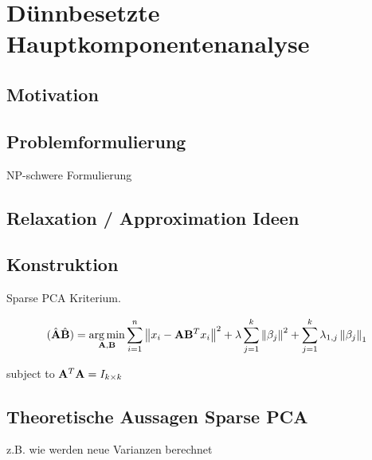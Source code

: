 \chapter{Dünnbesetzte Hauptkomponentenanalyse}

\label{sparse_pca}

\section{Motivation}

\section{Problemformulierung}
NP-schwere Formulierung

\section{Relaxation / Approximation Ideen}

\section{Konstruktion}

Sparse PCA Kriterium.

$$(\hat{\mathbf{A}}\hat{\mathbf{B}}) = \operatorname*{arg\,min}_{\mathbf{A}, \mathbf{B}} \sum_{i=1}^{n} \left\lVert x_i - \mathbf{A}\mathbf{B}^Tx_i \right\rVert^2 + \lambda \sum_{j=1}^{k}\left\lVert \beta_j \right\rVert^2 + \sum_{j=1}^k \lambda_{1,j} \left\lVert \beta_j \right\rVert_1$$

subject to $\mathbf{A}^T\mathbf{A} = I_{k \times k}$

\section{Theoretische Aussagen Sparse PCA}
z.B. wie werden neue Varianzen berechnet